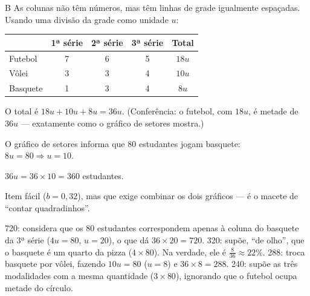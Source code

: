 \begin{resolucao}{B}
 As colunas não têm números, mas têm linhas de grade igualmente espaçadas. Usando uma divisão da grade como unidade $u$:
\begin{center}\small
\begin{tabular}{lcccc}
\toprule
& 1ª série & 2ª série & 3ª série & Total\\
\midrule
Futebol & 7 & 6 & 5 & $18u$\\
Vôlei & 3 & 3 & 4 & $10u$\\
Basquete & 1 & 3 & 4 & $8u$\\
\bottomrule
\end{tabular}
\end{center}
O total é $18u+10u+8u=36u$. (Conferência: o futebol, com $18u$, é metade de $36u$ — exatamente como o gráfico de setores mostra.)

 O gráfico de setores informa que 80 estudantes jogam basquete: $8u=80\Rightarrow u=10$.

 $36u=36\times10=360$ estudantes.


Item fácil ($b=0{,}32$), mas que exige combinar os dois gráficos — é o macete de “contar quadradinhos”.
\begin{distratores}
 720: considera que os 80 estudantes correspondem apenas à coluna do basquete da 3ª série ($4u=80$, $u=20$), o que dá $36\times20=720$.
 320: supõe, “de olho”, que o basquete é um quarto da pizza ($4\times80$). Na verdade, ele é $\frac{8}{36}\approx22\%$.
 288: troca basquete por vôlei, fazendo $10u=80$ ($u=8$) e $36\times8=288$.
 240: supõe as três modalidades com a mesma quantidade ($3\times80$), ignorando que o futebol ocupa metade do círculo.
\end{distratores}
\end{resolucao}


